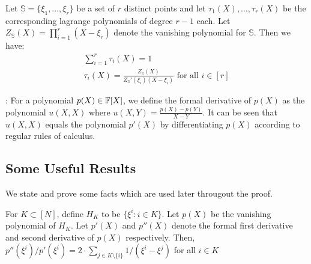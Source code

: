 \begin{fact}\label{fc:lagrange}
Let $\mathbb{S}=\{\xi_1,\ldots,\xi_r\}$ be a set of $r$ distinct points and let $\tau_1(X),\ldots,\tau_r(X)$ be
the corresponding lagrange polynomials of degree $r-1$ each. Let $Z_{\mathbb{S}}(X)=\prod_{i=1}^r (X-\xi_r)$ denote the vanishing polynomial
for $\mathbb{S}$. Then we have:
\begin{gather*}
    \sum_{i=1}^r \tau_i(X) = 1 \\
    \tau_i(X) = \frac{Z_{\mathbb{S}}(X)}{Z_{\mathbb{S}}'(\xi_i)(X-\xi_i)} \text{ for all } i\in [r]
\end{gather*}
\end{fact}

: For a polynomial $p(X) \in \mathbb{F}[X]$, we define the formal derivative of $p(X)$ as the polynomial
$u(X,X)$ where $u(X,Y)=\frac{p(X)-p(Y)}{X-Y}$. It can be seen that $u(X,X)$ equals the polynomial $p'(X)$ by differentiating
$p(X)$ according to regular rules of calculus.

\subsection{Some Useful Results}\label{subsec:sub-results}
We state and prove some facts which are used later througout the proof.

\begin{lemma}\label{lem:sumtoder}
For $K\subset [N]$, define $H_K$ to be $\{\xi^i:i \in K\}$. Let $p(X)$ be the vanishing polynomial of $H_{K}$.
Let $p'(X)$ and $p''(X)$ denote the formal first derivative and second derivative of $p(X)$ respectively.
Then, $p''(\xi^i)/p'(\xi^i)=2 \cdot \sum_{j\in K\setminus \{i\}} 1/(\xi^i-\xi^j)$ for all $i \in K$
\end{lemma}

